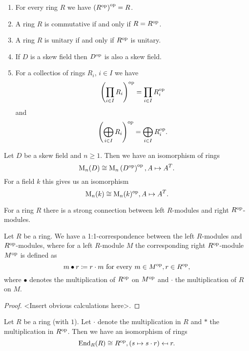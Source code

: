 \begin{rem}
  \begin{enumerate}[label=\emph{\alph*)},leftmargin=*]
    \item
      For every ring $R$ we have $\left( R^{\mathrm{op}} \right)^{\mathrm{op}} = R$.
    \item
      A ring $R$ is commutative if and only if $R = R^{\mathrm{op}}$.
    \item
      A ring $R$ is unitary if and only if $R^{\mathrm{op}}$ is unitary.
    \item
      If $D$ is a skew field then $D^{\mathrm{op}}$ is also a skew field.
    \item
      For a collectios of rings $R_i$, $i \in I$ we have
      \[
        \left( \prod_{i \in I} R_i \right)^{\mathrm{op}} = \prod_{i \in I} R_i^{\mathrm{op}}
      \]
      and
      \[
        \left( \bigoplus_{i \in I} R_i \right)^{\mathrm{op}} = \bigoplus_{i \in I} R_i^{\mathrm{op}}.
      \]
  \end{enumerate}
\end{rem}


\begin{expl}
  Let $D$ be a skew field and $n \geq 1$. Then we have an isomorphism of rings
  \[
    \operatorname{M}_n(D) \cong \operatorname{M}_n\left( D^{\mathrm{op}} \right)^{\mathrm{op}}, A \mapsto A^T.
  \]
  For a field $k$ this gives us an isomorphism
  \[
    \operatorname{M}_n(k) \cong \operatorname{M}_n(k)^{\mathrm{op}}, A \mapsto A^T.
  \]
\end{expl}


For a ring $R$ there is a strong connection between left $R$-modules and right $R^{\mathrm{op}}$-modules.


\begin{prop}\label{prop: opposite modules}
  Let $R$ be a ring. We have a 1:1-correspondence between the left $R$-modules and $R^{\mathrm{op}}$-modules, where for a left $R$-module $M$ the corresponding right $R^{\mathrm{op}}$-module $M^{\mathrm{op}}$ is defined as
  \[
    m \bullet r \coloneqq r \cdot m \text{ for every } m \in M^{\mathrm{op}}, r \in R^{\mathrm{op}},
  \]
  where $\bullet$ denotes the multiplication of $R^{\mathrm{op}}$ on $M^{\mathrm{op}}$ and $\cdot$ the multiplication of $R$ on $M$.
\end{prop}
\begin{proof}
  <Insert obvious calculations here>.
\end{proof}


\begin{lem}\label{lem: End_R(R) = Rop}
  Let $R$ be a ring (with $1$). Let $\cdot$ denote the multiplication in $R$ and $*$ the multiplication in $R^{\mathrm{op}}$. Then we have an isomorphism of rings
  \[
    \operatorname{End}_R(R) \cong R^{\mathrm{op}},
    (s \mapsto s \cdot r) \mapsfrom r.
  \]
\end{lem}


